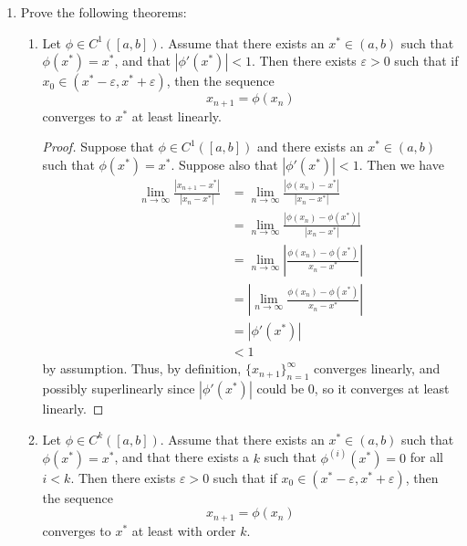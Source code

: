 \documentclass[11pt,oneside,english,reqno]{amsart}
\theoremstyle{definition}
\newcommand{\ve}{\varepsilon}
\newcommand{\1}{\mathbbm{1}}
\begin{document}
\begin{enumerate}[leftmargin=*]
\pagebreak

\item Prove the following theorems:

\begin{enumerate}
\itemsep5mm
\item Let $\phi\in C^1([a,b])$. Assume that there exists an $x^*\in (a,b)$ such that $\phi(x^*)=x^*$, and that $|\phi'(x^*)|<1$. Then there exists $\ve>0$ such that if $x_0\in(x^*-\ve,x^*+\ve)$, then the sequence
\[
x_{n+1}=\phi(x_n)
\]
converges to $x^*$ at least linearly.

\begin{proof}
Suppose that $\phi\in C^1([a,b])$ and there exists an $x^*\in (a,b)$ such that $\phi(x^*)=x^*$. Suppose also that $|\phi'(x^*)|<1$. Then we have
\begin{align*}
\lim_{n\to\infty}\frac{|x_{n+1}-x^*|}{|x_n-x^*|}&=\lim_{n\to\infty}\frac{|\phi(x_n)-x^*|}{|x_n-x^*|}\\[2mm]
&=\lim_{n\to\infty}\frac{|\phi(x_n)-\phi(x^*)|}{|x_n-x^*|}\\[2mm]
&=\lim_{n\to\infty}\left|\frac{\phi(x_n)-\phi(x^*)}{x_n-x^*}\right|\\[2mm]
&=\left|\lim_{n\to\infty}\frac{\phi(x_n)-\phi(x^*)}{x_n-x^*}\right|\\[2mm]
&=|\phi'(x^*)|\\[2mm]
&<1
\end{align*}
by assumption. Thus, by definition, $\{x_{n+1}\}_{n=1}^\infty$ converges linearly, and possibly superlinearly since $|\phi'(x^*)|$ could be 0, so it converges at least linearly.
\end{proof}

\item Let $\phi\in C^k([a,b])$. Assume that there exists an $x^*\in (a,b)$ such that $\phi(x^*)=x^*$, and that there exists a $k$ such that $\phi^{(i)}(x^*)=0$ for all $i<k$. Then there exists $\ve>0$ such that if $x_0\in(x^*-\ve,x^*+\ve)$, then the sequence
\[
x_{n+1}=\phi(x_n)
\]
converges to $x^*$ at least with order $k$.


\end{enumerate}
\end{enumerate}
\end{document}
